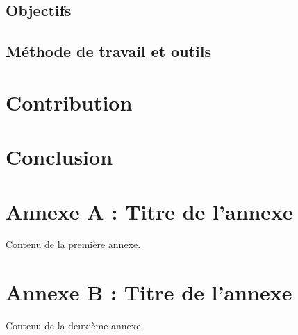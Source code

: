 \documentclass[11pt]{article}
\theoremstyle{definition}
\theoremstyle{remark}
\begin{document}
    \subsection{Objectifs}
    \subsection{Méthode de travail et outils}

\newpage
\section{Contribution}
    

\section{Conclusion}

\newpage

\printbibliography

\newpage

\appendix

\section{Annexe A : Titre de l'annexe}
Contenu de la première annexe.

\section{Annexe B : Titre de l'annexe}
Contenu de la deuxième annexe.

\end{document}
